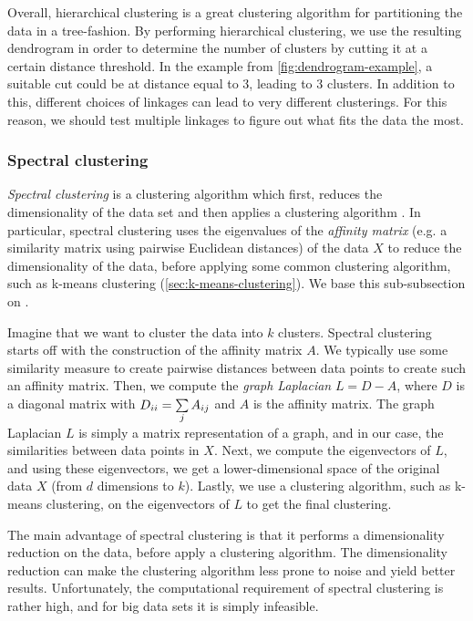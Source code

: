 Overall, hierarchical clustering is a great clustering algorithm for partitioning the data in a tree-fashion. By performing hierarchical clustering, we use the resulting dendrogram in order to determine the number of clusters by cutting it at a certain distance threshold. In the example from \cref{fig:dendrogram-example}, a suitable cut could be at distance equal to 3, leading to 3 clusters. In addition to this, different choices of linkages can lead to very different clusterings. For this reason, we should test multiple linkages to figure out what fits the data the most.

\subsubsection{Spectral clustering}
\label{sec:spectral-clustering}
\textit{Spectral clustering} is a clustering algorithm which first, reduces the dimensionality of the data set and then applies a clustering algorithm \cite{Andrew2002}. In particular, spectral clustering uses the eigenvalues of the \textit{affinity matrix} (e.g. a similarity matrix using pairwise Euclidean distances) of the data $X$ to reduce the dimensionality of the data, before applying some common clustering algorithm, such as k-means clustering (\cref{sec:k-means-clustering}). We base this sub-subsection on \cite{Andrew2002}.

Imagine that we want to cluster the data into $k$ clusters. Spectral clustering starts off with the construction of the affinity matrix $A$. We typically use some similarity measure to create pairwise distances between data points to create such an affinity matrix. Then, we compute the \textit{graph Laplacian} $L = D - A$, where $D$ is a diagonal matrix with $D_{ii} = \sum\limits_{j}^{} A_{ij}$ and $A$ is the affinity matrix. The graph Laplacian $L$ is simply a matrix representation of a graph, and in our case, the similarities between data points in $X$. Next, we compute the eigenvectors of $L$, and using these eigenvectors, we get a lower-dimensional space of the original data $X$ (from $d$ dimensions to $k$). Lastly, we use a clustering algorithm, such as k-means clustering, on the eigenvectors of $L$ to get the final clustering.

The main advantage of spectral clustering is that it performs a dimensionality reduction on the data, before apply a clustering algorithm. The dimensionality reduction can make the clustering algorithm less prone to noise and yield better results. Unfortunately, the computational requirement of spectral clustering is rather high, and for big data sets it is simply infeasible.

